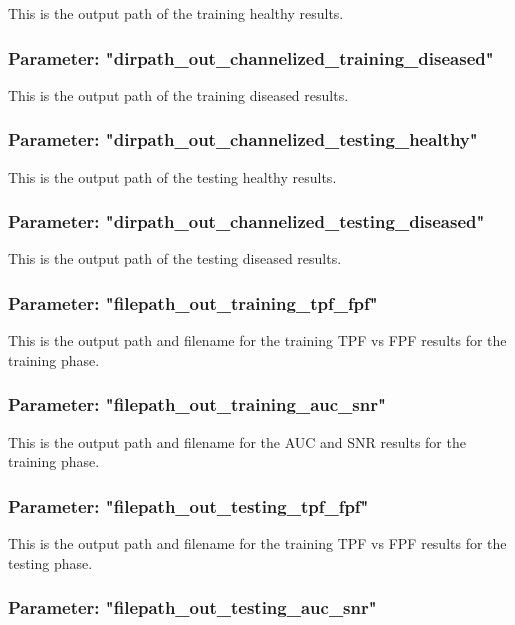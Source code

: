 This is the output path of the training healthy results.

\subsubsection{Parameter: "dirpath\_out\_channelized\_training\_diseased"}

This is the output path of the training diseased results.


\subsubsection{Parameter: "dirpath\_out\_channelized\_testing\_healthy"}

This is the output path of the testing healthy results.


\subsubsection{Parameter: "dirpath\_out\_channelized\_testing\_diseased"}

This is the output path of the testing diseased results.


\subsubsection{Parameter: "filepath\_out\_training\_tpf\_fpf"}

This is the output path and filename for the training TPF vs FPF results for the training phase.

\subsubsection{Parameter: "filepath\_out\_training\_auc\_snr"}

This is the output path and filename for the AUC and SNR results for the training phase.

\subsubsection{Parameter: "filepath\_out\_testing\_tpf\_fpf"}

This is the output path and filename for the training TPF vs FPF results for the testing phase.

\subsubsection{Parameter: "filepath\_out\_testing\_auc\_snr"}

